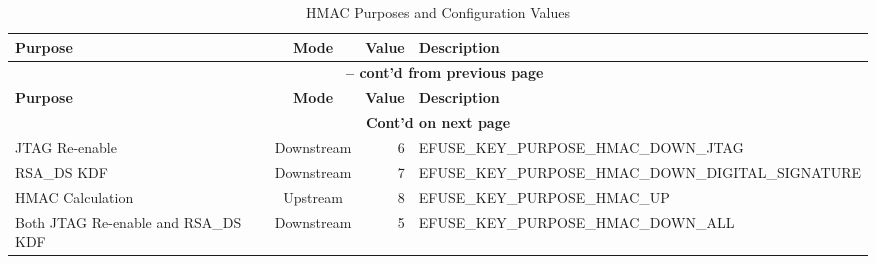 \begin{longtable}[c]{|p{3.5cm}|c|r|p{9.5cm}|}
\caption{HMAC Purposes and Configuration Values}
\label{tab:hmac-key-purpose}
\\    \hline
    \rowcolor{lightgray}
    \textbf{Purpose} & \textbf{Mode} & \textbf{Value} & \textbf{Description}\\
    \hline
    \endfirsthead
    \multicolumn{4}{c}{\bfseries \tablename\ \thetable{} -- cont'd from previous page}\\\hline

    \rowcolor{lightgray}
    \textbf{Purpose} & \textbf{Mode} & \textbf{Value} & \textbf{Description}\\
    \hline
    \endhead
    \multicolumn{4}{c}{\textbf{Cont'd on next page}}\\
    \endfoot
    \endlastfoot

    \hline
    JTAG Re-enable & Downstream & 6 & EFUSE\_KEY\_PURPOSE\_HMAC\_DOWN\_JTAG \\
    \hline
    RSA\_DS KDF & Downstream & 7 & EFUSE\_KEY\_PURPOSE\_HMAC\_DOWN\_DIGITAL\_SIGNATURE \\
    \hline
    HMAC Calculation  & Upstream & 8 & EFUSE\_KEY\_PURPOSE\_HMAC\_UP \\    
    \hline
    Both JTAG Re-enable and RSA\_DS KDF & Downstream & 5 & EFUSE\_KEY\_PURPOSE\_HMAC\_DOWN\_ALL \\
    \hline
\end{longtable}